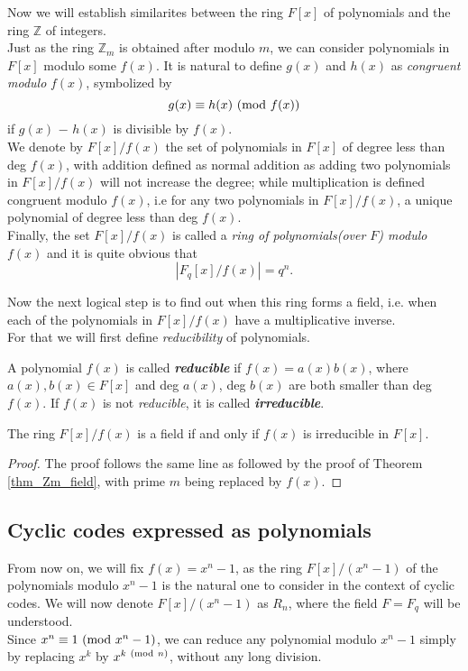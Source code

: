 \documentclass[../main.tex]{subfiles}
\newcommand{\poly}[1]{$#1(x)$}
\begin{document}
Now we will establish similarites between the ring $F[x]$ of polynomials and the ring $\mathbb{Z}$ of integers.\\
Just as the ring $\mathbb{Z}_m$ is obtained after modulo $m$, we can consider polynomials in $F[x]$ modulo some \poly{f}. It is natural to define \poly{g} and \poly{h} as \emph{congruent modulo} \poly{f}, symbolized by
\[
	g(x) \equiv h(x) \ (\mathrm{mod}\ f(x))
\] 
if \poly{g} $-$ \poly{h} is divisible by $f(x)$.\\

We denote by $F[x]/f(x)$ the set of polynomials in $F[x]$ of degree less than deg \poly{f}, with addition defined as normal addition as adding two polynomials in $F[x]/f(x)$ will not increase the degree; while multiplication is defined congruent modulo $f(x)$, i.e for any two polynomials in $F[x]/f(x)$, a unique polynomial of degree less than deg \poly{f}.\\

Finally, the set $F[x]/f(x)$ is called a \emph{ring of polynomials(over $F$) modulo \poly{f}} and it is quite obvious that 
\[
	|F_q[x]/f(x)| = q^n.
\]

Now the next logical step is to find out when this ring forms a field, i.e. when each of the polynomials in $F[x]/f(x)$ have a multiplicative inverse.\\ 
For that we will first define \emph{reducibility} of polynomials.

\begin{defn}
	A polynomial \poly{f} is called \textbf{\emph{reducible}} if $f(x) = a(x)b(x)$, where $a(x), b(x) \in F[x]$ and deg \poly{a}, deg \poly{b} are both smaller than deg \poly{f}. If \poly{f} is not \emph{reducible}, it is called \textbf{\emph{irreducible}}. 
\end{defn}

\begin{thm}
	The ring $F[x]/f(x)$ is a field if and only if $f(x)$ is irreducible in $F[x]$. 
\end{thm}
\begin{proof}
	The proof follows the same line as followed by the proof of Theorem \ref{thm_Zm_field}, with prime $m$ being replaced by $f(x)$.
\end{proof}

\subsection{Cyclic codes expressed as polynomials}

From now on, we will fix $f(x)=x^n-1$, as the ring $F[x]/(x^n-1)$ of the polynomials modulo $x^n-1$ is the natural one to consider in the context of cyclic codes. We will now denote $F[x]/(x^n-1)$ as $R_n$, where the field $F=F_q$ will be understood.\\
Since $x^n \equiv 1 \ (\mathrm{mod}\ x^n-1)$, we can reduce any polynomial modulo $x^n-1$ simply by replacing $x^k$ by $x^{k\ (\mathrm{mod}\ n)}$, without any long division.\\
\end{document}
